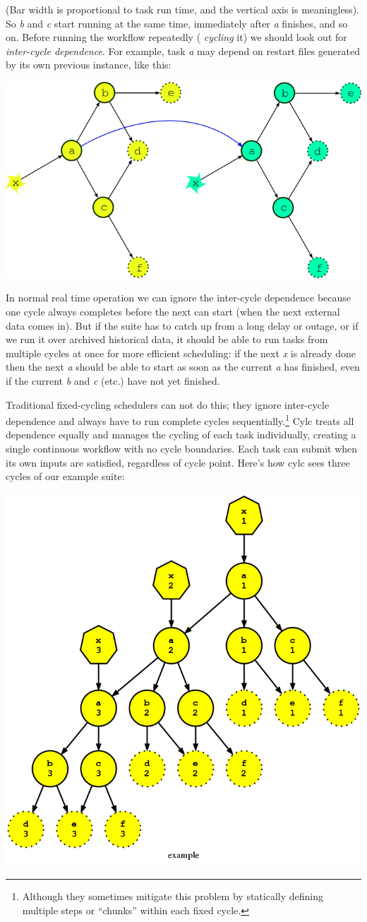 (Bar width is proportional to task run time, and the vertical axis is
meaningless). So {\em b} and {\em c} start running at the same time, immediately
after {\em a} finishes, and so on. Before running the workflow repeatedly ({\em
cycling} it) we should look out for {\em inter-cycle dependence}.   For
example, task {\em a} may depend on restart files generated by its own previous
instance, like this:

\begin{center}
    \includegraphics[width=0.5\columnwidth]{resources/tex/dep-two-cycles-linked}
\end{center}

In normal real time operation we can ignore the inter-cycle dependence because
one cycle always completes before the next can start (when the next external
data comes in).  But if the suite has to catch up from a long delay or outage,
or if we run it over archived historical data, it should be able to run tasks
from multiple cycles at once for more efficient scheduling: if the next {\em x}
is already done then the next {\em a} should be able to start as soon as the
current {\em a} has finished, even if the current {\em b} and {\em c} (etc.)
have not yet finished.

Traditional fixed-cycling schedulers can not do this; they ignore inter-cycle
dependence and always have to run complete cycles
sequentially.\footnote{Although they sometimes mitigate this problem by
statically defining multiple steps or ``chunks'' within each fixed cycle.} Cylc
treats all dependence equally and manages the cycling of each task
individually, creating a single continuous workflow with no cycle boundaries.
Each task can submit when its own inputs are satisfied, regardless
of cycle point.  Here's how cylc sees three cycles of our example suite:

\begin{center}
    \includegraphics[width=0.45\columnwidth]{resources/example-3cycles.png}
\end{center}

